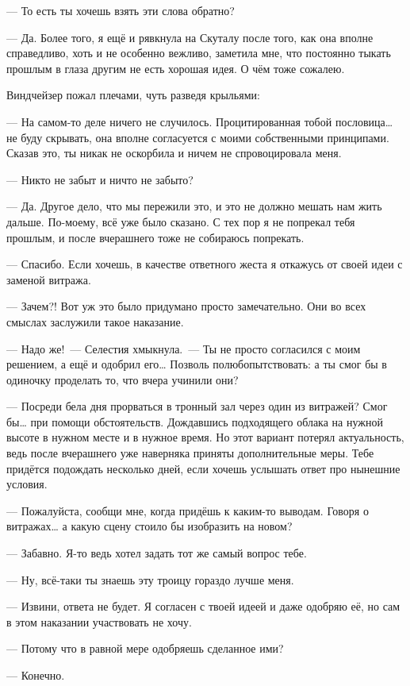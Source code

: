 \documentclass[fontsize=11pt,a5paper,titlepage=firstcover]{scrbook}
\begin{document}
--- То есть ты хочешь взять эти слова обратно?

--- Да. Более того, я ещё и рявкнула на Скуталу после того, как она вполне справедливо, хоть и не особенно вежливо, заметила мне, что постоянно тыкать прошлым в глаза другим не есть хорошая идея. О чём тоже сожалею.

Виндчейзер пожал плечами, чуть разведя крыльями:

--- На самом-то деле ничего не случилось. Процитированная тобой пословица{\ldots} не буду скрывать, она вполне согласуется с моими собственными принципами. Сказав это, ты никак не оскорбила и ничем не спровоцировала меня.

--- Никто не забыт и ничто не забыто?

--- Да. Другое дело, что мы пережили это, и это не должно мешать нам жить дальше. По-моему, всё уже было сказано. С тех пор я не попрекал тебя прошлым, и после вчерашнего тоже не собираюсь попрекать.

--- Спасибо. Если хочешь, в качестве ответного жеста я откажусь от своей идеи с заменой витража.

--- Зачем?! Вот уж это было придумано просто замечательно. Они во всех смыслах заслужили такое наказание.

--- Надо же!~--- Селестия хмыкнула.~--- Ты не просто согласился с моим решением, а ещё и одобрил его{\ldots} Позволь полюбопытствовать: а ты смог бы в одиночку проделать то, что вчера учинили они?

--- Посреди бела дня прорваться в тронный зал через один из витражей? Смог бы{\ldots} при помощи обстоятельств. Дождавшись подходящего облака на нужной высоте в нужном месте и в нужное время. Но этот вариант потерял актуальность, ведь после вчерашнего уже наверняка приняты дополнительные меры. Тебе придётся подождать несколько дней, если хочешь услышать ответ про нынешние условия.

--- Пожалуйста, сообщи мне, когда придёшь к каким-то выводам. Говоря о витражах{\ldots} а какую сцену стоило бы изобразить на новом?

--- Забавно. Я-то ведь хотел задать тот же самый вопрос тебе.

--- Ну, всё-таки ты знаешь эту троицу гораздо лучше меня.

--- Извини, ответа не будет. Я согласен с твоей идеей и даже одобряю её, но сам в этом наказании участвовать не хочу.

--- Потому что в равной мере одобряешь сделанное ими?

--- Конечно.
\end{document}
